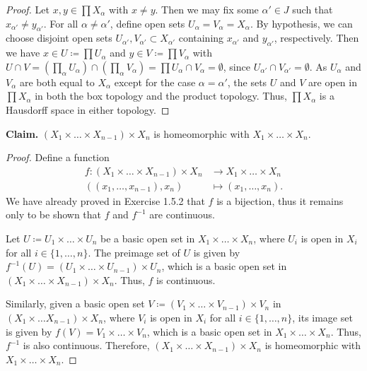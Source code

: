 \documentclass[a4paper,10pt]{article}
\begin{document}
\begin{solution}
    \begin{proof}
        Let $x, y \in \prod X_\alpha$ with $x \neq y$.
        Then we may fix some $\alpha' \in J$ such that $x_{\alpha'} \neq y_{\alpha'}$.
        For all $\alpha \neq \alpha'$, define open sets $U_\alpha = V_\alpha = X_\alpha$.
        By hypothesis, we can choose disjoint open sets $U_{\alpha'}, V_{\alpha'} \subset X_{\alpha'}$ containing $x_{\alpha'}$ and $y_{\alpha'}$, respectively.
        Then we have $x \in U \coloneq \prod U_\alpha$ and $y \in V \coloneq \prod V_\alpha$ with $U \cap V = \left(\prod_\alpha U_\alpha\right) \cap \left(\prod_\alpha V_\alpha\right) = \prod U_\alpha \cap V_\alpha = \emptyset$, since $U_{\alpha'} \cap V_{\alpha'} = \emptyset$.
        As $U_\alpha$ and $V_\alpha$ are both equal to $X_\alpha$ except for the case $\alpha = \alpha'$, the sets $U$ and $V$ are open in $\prod X_\alpha$ in both the box topology and the product topology.
        Thus, $\prod X_\alpha$ is a Hausdorff space in either topology.
    \end{proof}
\end{solution}
\newpage

\begin{exercise}[ID=2.19.4]
    {\bf Claim.} $(X_1 \times \ldots \times X_{n-1}) \times X_n$ is homeomorphic with $X_1 \times \ldots \times X_n$.
\end{exercise}

\begin{solution}
    \begin{proof}
        Define a function
        \begin{align*}
            f: (X_1 \times \ldots \times X_{n-1}) \times X_n & \rightarrow X_1 \times \ldots \times X_n \\
            ((x_1, \ldots, x_{n-1}), x_n)                    & \mapsto (x_1, \ldots, x_n).
        \end{align*}
        We have already proved in Exercise 1.5.2 that $f$ is a bijection, thus it remains only to be shown that $f$ and $f^{-1}$ are continuous.

        Let $U \coloneq U_1 \times \ldots \times U_n$ be a basic open set in $X_1 \times \ldots \times X_n$, where $U_i$ is open in $X_i$ for all $i \in \{1, \ldots, n\}$.
        The preimage set of $U$ is given by $f^{-1}(U) = (U_1 \times \ldots \times U_{n-1}) \times U_n$, which is a basic open set in $(X_1 \times \ldots \times X_{n-1}) \times X_n$.
        Thus, $f$ is continuous.

        Similarly, given a basic open set $V \coloneq (V_1 \times \ldots \times V_{n-1}) \times V_n$ in $(X_1 \times \ldots X_{n-1}) \times X_n$, where $V_i$ is open in $X_i$ for all $i \in \{1, \ldots, n\}$, its image set is given by $f(V) = V_1 \times \ldots \times V_n$, which is a basic open set in $X_1 \times \ldots \times X_n$.
        Thus, $f^{-1}$ is also continuous.
        Therefore, $(X_1 \times \ldots \times X_{n-1}) \times X_n$ is homeomorphic with $X_1 \times \ldots \times X_n$.
    \end{proof}
\end{solution}
\newpage
\end{document}
